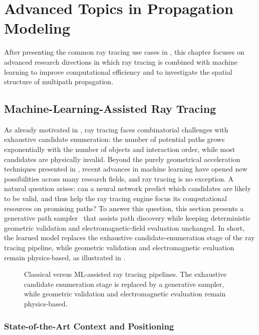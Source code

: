 \chapter{Advanced Topics in Propagation Modeling}

After presenting the common ray tracing use cases in , this chapter focuses on advanced research directions in which ray tracing is combined with machine learning to improve computational efficiency and to investigate the spatial structure of multipath propagation.

\section{Machine-Learning-Assisted Ray Tracing}

As already motivated in , ray tracing faces combinatorial challenges with exhaustive candidate enumeration: the number of potential paths grows exponentially with the number of objects and interaction order, while most candidates are physically invalid. Beyond the purely geometrical acceleration techniques presented in , recent advances in machine learning have opened new possibilities across many research fields, and ray tracing is no exception. A natural question arises: can a neural network predict which candidates are likely to be valid, and thus help the ray tracing engine focus its computational resources on promising paths? To answer this question, this section presents a generative path sampler~ that assists path discovery while keeping deterministic geometric validation and electromagnetic-field evaluation unchanged. In short, the learned model replaces the exhaustive candidate-enumeration stage of the ray tracing pipeline, while geometric validation and electromagnetic evaluation remain physics-based, as illustrated in .

\begin{figure}
  \centering
  \caption{Classical versus ML-assisted ray tracing pipelines. The exhaustive candidate enumeration stage is replaced by a generative sampler, while geometric validation and electromagnetic evaluation remain physics-based.}
\end{figure}

\subsection{State-of-the-Art Context and Positioning}

